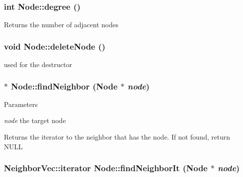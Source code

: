 \hypertarget{classNode_a83a14e84b986038eb444e8945849d127}{
\subsubsection[{degree}]{\setlength{\rightskip}{0pt plus 5cm}int Node::degree ()}}
\label{classNode_a83a14e84b986038eb444e8945849d127}
\begin{DoxyReturn}{Returns}
the number of adjacent nodes 
\end{DoxyReturn}
\hypertarget{classNode_aaccc6f1874a0ddf07d281270d9f9c301}{
\subsubsection[{deleteNode}]{\setlength{\rightskip}{0pt plus 5cm}void Node::deleteNode ()}}
\label{classNode_aaccc6f1874a0ddf07d281270d9f9c301}
used for the destructor \hypertarget{classNode_a522b44457c22e6c97e7becfec43cbdba}{
\subsubsection[{findNeighbor}]{ $\ast$ Node::findNeighbor ({\bf Node} $\ast$ {\em node})}}
\label{classNode_a522b44457c22e6c97e7becfec43cbdba}

\begin{DoxyParams}{Parameters}
\item[{\em node}]the target node \end{DoxyParams}
\begin{DoxyReturn}{Returns}
the iterator to the neighbor that has the node. If not found, return NULL 
\end{DoxyReturn}
\hypertarget{classNode_acb2b4563be11a48ec1503bb22a56893a}{
\subsubsection[{findNeighborIt}]{\setlength{\rightskip}{0pt plus 5cm}NeighborVec::iterator Node::findNeighborIt ({\bf Node} $\ast$ {\em node})}}
\label{classNode_acb2b4563be11a48ec1503bb22a56893a}

